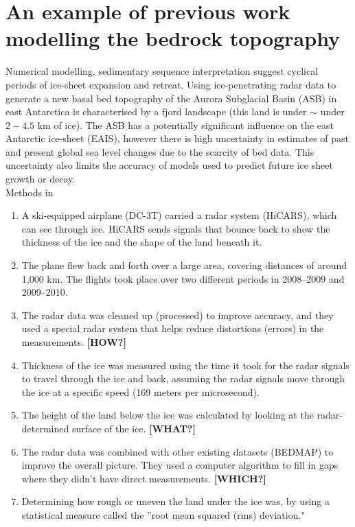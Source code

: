 \chapter{An example of previous work modelling the bedrock topography}\label{n1}

Numerical modelling, sedimentary sequence interpretation suggest cyclical periods of ice-sheet expansion and retreat\cite{Young2011}. Using ice-penetrating radar data to generate a new basal bed topography of the Aurora Subglacial Basin (ASB) in east Antarctica is characterised by a fjord landscape (this land is under $\sim$ under $2-4.5$ km of ice). The ASB has a potentially significant influence on the east Antarctic ice-sheet (EAIS), however there is high uncertainty in estimates of past and present global sea level changes due to the scarcity of bed data\cite{Young2011}. This uncertainty also limits the accuracy of models used to predict future ice sheet growth or decay.\\

{\large Methods in\cite{Young2011}}
\begin{enumerate}
    \item A ski-equipped airplane (DC-3T) carried a radar system (HiCARS), which can see through ice. HiCARS sends signals that bounce back to show the thickness of the ice and the shape of the land beneath it.
    \item The plane flew back and forth over a large area, covering distances of around 1,000 km. The flights took place over two different periods in 2008–2009 and 2009–2010.
    \item The radar data was cleaned up (processed) to improve accuracy, and they used a special radar system that helps reduce distortions (errors) in the measurements. \textbf{[HOW?]}
    \item Thickness of the ice was measured using the time it took for the radar signals to travel through the ice and back, assuming the radar signals move through the ice at a specific speed (169 meters per microsecond).
    \item The height of the land below the ice was calculated by looking at the radar-determined surface of the ice. \textbf{[WHAT?]}
    \item The radar data was combined with other existing datasets (BEDMAP) to improve the overall picture. They used a computer algorithm to fill in gaps where they didn’t have direct measurements. \textbf{[WHICH?]}
    \item Determining how rough or uneven the land under the ice was, by using a statistical measure called the ''root mean squared (rms) deviation."
\end{enumerate}

